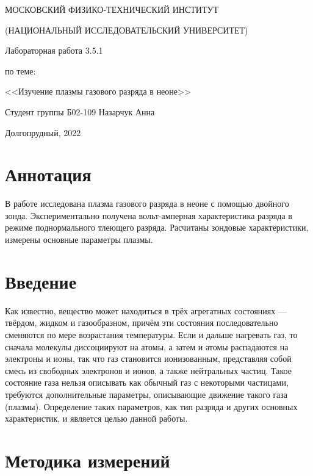\documentclass[a4paper,12pt]{article} %
\date{}
\begin{document}
\begin{titlepage}

\thispagestyle{empty}

\centerline{МОСКОВСКИЙ ФИЗИКО-ТЕХНИЧЕСКИЙ ИНСТИТУТ}
\centerline{(НАЦИОНАЛЬНЫЙ ИССЛЕДОВАТЕЛЬСКИЙ УНИВЕРСИТЕТ)}

\vfill

\centerline{\huge{Лабораторная работа 3.5.1}}
\centerline{\large{по теме:}}
\centerline{\LARGE{<<Изучение плазмы газового разряда в неоне>>}}

\vfill

Студент группы Б02-109 \hfill Назарчук Анна

\vfill

\centerline{Долгопрудный, 2022}
\clearpage
\end{titlepage} 
\section{Аннотация}
В работе исследована плазма газового разряда в неоне с помощью двойного зонда. Экспериментально получена вольт-амперная характеристика разряда в режиме поднормального тлеющего разряда. Расчитаны зондовые характеристики, измерены основные параметры плазмы.


\section{Введение}
Как известно, вещество может находиться в трёх агрегатных состояниях
— твёрдом, жидком и газообразном, причём эти состояния последовательно
сменяются по мере возрастания температуры. Если и дальше
нагревать газ, то сначала молекулы диссоциируют на атомы, а затем и
атомы распадаются на электроны и ионы, так что газ становится ионизованным,
представляя собой смесь из свободных электронов и ионов,
а также нейтральных частиц. Такое состояние газа нельзя описывать как обычный газ с некоторыми частицами, требуются дополнительные параметры, описывающие движение такого газа (плазмы). Определение таких параметров, как тип разряда и других основных характеристик, и является целью данной работы.


\section{Методика измерений}
\end{document}
